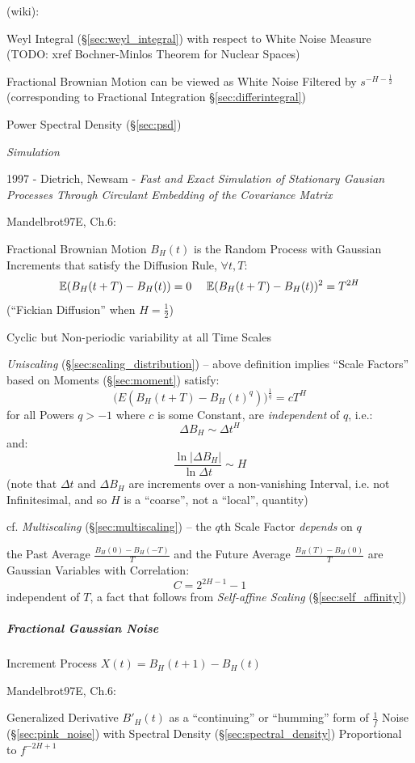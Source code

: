 (wiki):

Weyl Integral (\S\ref{sec:weyl_integral}) with respect to White Noise Measure
(TODO: xref Bochner-Minlos Theorem for Nuclear Spaces)

Fractional Brownian Motion can be viewed as White Noise Filtered by
$s^{-H-\frac{1}{2}}$ (corresponding to Fractional Integration
\S\ref{sec:differintegral})

Power Spectral Density (\S\ref{sec:psd})

\emph{Simulation}

1997 - Dietrich, Newsam - \emph{Fast and Exact Simulation of Stationary Gausian
  Processes Through Circulant Embedding of the Covariance Matrix}

Mandelbrot97E, Ch.6:

Fractional Brownian Motion $B_H(t)$ is the Random Process with Gaussian
Increments that satisfy the Diffusion Rule, $\forall t, T$:
\[
  \expect(B_H(t+T) - B_H(t)) = 0 \ \ \ \ \expect(B_H(t+T) - B_H(t))^2 = T^{2H}
\]
(``Fickian Diffusion'' when $H = \frac{1}{2}$)

Cyclic but Non-periodic variability at all Time Scales

\emph{Uniscaling} (\S\ref{sec:scaling_distribution}) -- above definition implies
``Scale Factors'' based on Moments (\S\ref{sec:moment}) satisfy:
\[
  \Big(E(B_H(t + T) - B_H(t)^q)\Big)^{\frac{1}{q}} = c T^H
\]
for all Powers $q > -1$ where $c$ is some Constant, are \emph{independent} of
$q$, i.e.:
\[
  \Delta B_H \sim \Delta t^H
\]
and:
\[
  \frac{\ln|\Delta B_H|}{\ln \Delta{t}} \sim H
\]
(note that $\Delta t$ and $\Delta B_H$ are increments over a non-vanishing
Interval, i.e. not Infinitesimal, and so $H$ is a ``coarse'', not a ``local'',
quantity)

cf. \emph{Multiscaling} (\S\ref{sec:multiscaling}) -- the $q$th Scale Factor
\emph{depends} on $q$

the Past Average $\frac{B_H(0) - B_H(-T)}{T}$ and the Future Average
$\frac{B_H(T) - B_H(0)}{T}$ are Gaussian Variables with Correlation:
\[
  C = 2^{2H-1} - 1
\]
independent of $T$, a fact that follows from \emph{Self-affine Scaling}
(\S\ref{sec:self_affinity})



\subparagraph{Fractional Gaussian Noise}\label{sec:fractional_gaussian}\hfill

Increment Process $X(t) = B_H(t+1) - B_H(t)$

Mandelbrot97E, Ch.6:

Generalized Derivative $B'_H(t)$ as a ``continuing'' or ``humming'' form of
$\frac{1}{f}$ Noise (\S\ref{sec:pink_noise}) with Spectral Density
(\S\ref{sec:spectral_density}) Proportional to $f^{-2H+1}$



